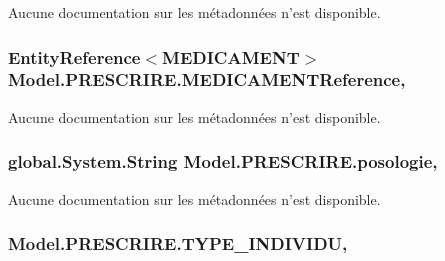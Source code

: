 Aucune documentation sur les métadonnées n'est disponible. 

\hypertarget{class_model_1_1_p_r_e_s_c_r_i_r_e_ae6eb0aa552e585dcd17936b993947f0c}{
\subsubsection[{M\-E\-D\-I\-C\-A\-M\-E\-N\-T\-Reference}]{\setlength{\rightskip}{0pt plus 5cm}Entity\-Reference$<${\bf M\-E\-D\-I\-C\-A\-M\-E\-N\-T}$>$ Model.\-P\-R\-E\-S\-C\-R\-I\-R\-E.\-M\-E\-D\-I\-C\-A\-M\-E\-N\-T\-Reference\hspace{0.3cm}{\ttfamily [get]}, {\ttfamily [set]}}}\label{class_model_1_1_p_r_e_s_c_r_i_r_e_ae6eb0aa552e585dcd17936b993947f0c}


Aucune documentation sur les métadonnées n'est disponible. 

\hypertarget{class_model_1_1_p_r_e_s_c_r_i_r_e_a1cf3de1e828418d612305ac1a6c62c04}{
\subsubsection[{posologie}]{\setlength{\rightskip}{0pt plus 5cm}global.\-System.\-String Model.\-P\-R\-E\-S\-C\-R\-I\-R\-E.\-posologie\hspace{0.3cm}{\ttfamily [get]}, {\ttfamily [set]}}}\label{class_model_1_1_p_r_e_s_c_r_i_r_e_a1cf3de1e828418d612305ac1a6c62c04}


Aucune documentation sur les métadonnées n'est disponible. 

\hypertarget{class_model_1_1_p_r_e_s_c_r_i_r_e_a894c92b24554d0819f2ac129895a7980}{
\subsubsection[{T\-Y\-P\-E\-\_\-\-I\-N\-D\-I\-V\-I\-D\-U}]{ Model.\-P\-R\-E\-S\-C\-R\-I\-R\-E.\-T\-Y\-P\-E\-\_\-\-I\-N\-D\-I\-V\-I\-D\-U\hspace{0.3cm}{\ttfamily [get]}, {\ttfamily [set]}}}\label{class_model_1_1_p_r_e_s_c_r_i_r_e_a894c92b24554d0819f2ac129895a7980}


